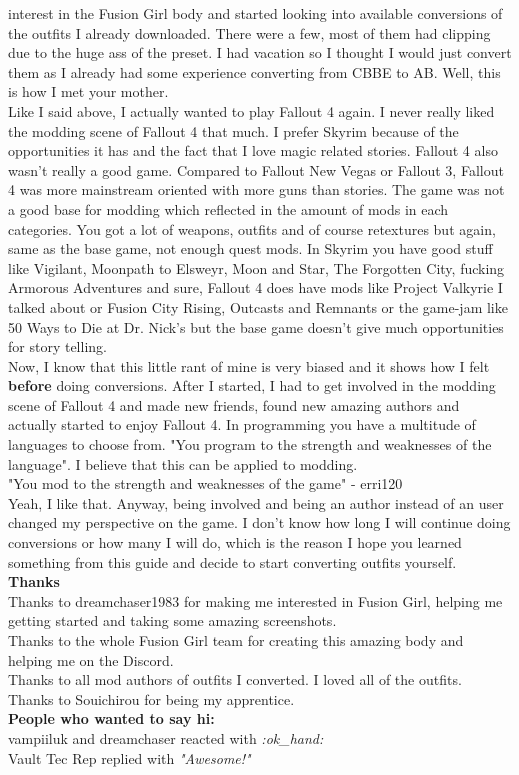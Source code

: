 interest in the Fusion Girl body and started looking into available conversions of the outfits I already downloaded. There were a few, 
most of them had clipping due to the huge ass of the preset. I had vacation so I thought I would just convert them as I already had 
some experience converting from CBBE to AB. Well, this is how I met your mother.\\
Like I said above, I actually wanted to play Fallout 4 again. I never really liked the modding scene of Fallout 4 that much. I prefer 
Skyrim because of the opportunities it has and the fact that I love magic related stories. Fallout 4 also wasn't really a good game.
Compared to Fallout New Vegas or Fallout 3, Fallout 4 was more mainstream oriented with more guns than stories. The game was not a 
good base for modding which reflected in the amount of mods in each categories. You got a lot of weapons, outfits and of course retextures 
but again, same as the base game, not enough quest mods. In Skyrim you have good stuff like Vigilant, Moonpath to Elsweyr, Moon and Star,
The Forgotten City, fucking Armorous Adventures and sure, Fallout 4 does have mods like Project Valkyrie I talked about or Fusion City 
Rising, Outcasts and Remnants or the game-jam like 50 Ways to Die at Dr. Nick's but the base game doesn't give much opportunities for 
story telling.\\
Now, I know that this little rant of mine is very biased and it shows how I felt \textbf{before} doing conversions. After I started, I 
had to get involved in the modding scene of Fallout 4 and made new friends, found new amazing authors and actually started to enjoy 
Fallout 4. In programming you have a multitude of languages to choose from. "You program to the strength and weaknesses of the language".
I believe that this can be applied to modding.\\
"You mod to the strength and weaknesses of the game" - erri120\\
Yeah, I like that. Anyway, being involved and being an author instead of an user changed my perspective on the game. I don't know how 
long I will continue doing conversions or how many I will do, which is the reason I hope you learned something from this guide and 
decide to start converting outfits yourself.\\
\textbf{Thanks}\\
Thanks to dreamchaser1983 for making me interested in Fusion Girl, helping me getting started and taking some amazing screenshots.\\
Thanks to the whole Fusion Girl team for creating this amazing body and helping me on the Discord.\\
Thanks to all mod authors of outfits I converted. I loved all of the outfits.\\
Thanks to Souichirou for being my apprentice.\\
\textbf{People who wanted to say hi:}\\
vampiiluk and dreamchaser reacted with \textit{:ok\_hand:}\\
Vault Tec Rep replied with \textit{"Awesome!"}